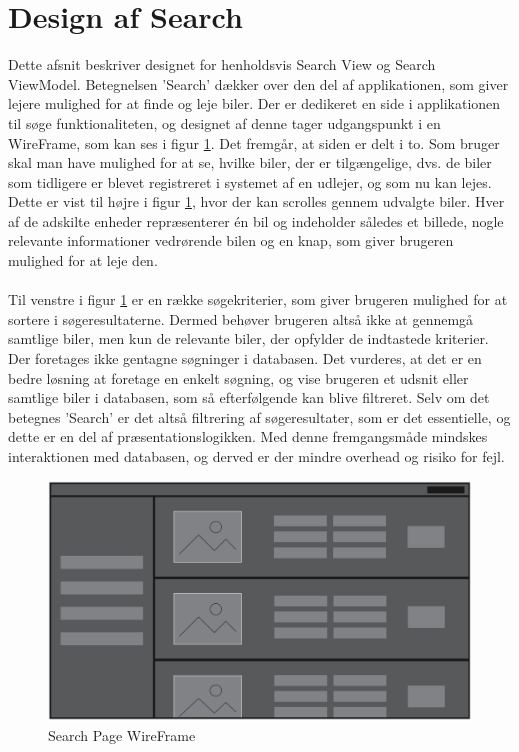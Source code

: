 \documentclass[SoftwareDesign/SoftwareDesign_main.tex]{subfiles}
\begin{document}
\section{Design af Search}
Dette afsnit beskriver designet for henholdsvis Search View og Search ViewModel. Betegnelsen 'Search' dækker over den del af applikationen, som giver lejere mulighed for at finde og leje biler. Der er dedikeret en side i applikationen til søge funktionaliteten, og designet af denne tager udgangspunkt i en WireFrame, som kan ses i figur \ref{fig:search_wireframe}. Det fremgår, at siden er delt i to. Som bruger skal man have mulighed for at se, hvilke biler, der er tilgængelige, dvs. de biler som tidligere er blevet registreret i systemet af en udlejer, og som nu kan lejes. Dette er vist til højre i figur \ref{fig:search_wireframe}, hvor der kan scrolles gennem udvalgte biler. Hver af de adskilte enheder repræsenterer én bil og indeholder således et billede, nogle relevante informationer vedrørende bilen og en knap, som giver brugeren mulighed for at leje den. \\\\Til venstre i figur \ref{fig:search_wireframe} er en række søgekriterier, som giver brugeren mulighed for at sortere i søgeresultaterne. Dermed behøver brugeren altså ikke at gennemgå samtlige biler, men kun de relevante biler, der opfylder de indtastede kriterier. Der foretages ikke gentagne søgninger i databasen. Det vurderes, at det er en bedre løsning at foretage en enkelt søgning, og vise brugeren et udsnit eller samtlige biler i databasen, som så efterfølgende kan blive filtreret. Selv om det betegnes 'Search' er det altså filtrering af søgeresultater, som er det essentielle, og dette er en del af præsentationslogikken. Med denne fremgangsmåde mindskes interaktionen med databasen, og derved er der mindre overhead og risiko for fejl.

\begin{figure}[H]
    \centering
    \includegraphics[width=\textwidth]{SoftwareDesign/MVVMDesigns/Graphics/SearchWireFrame.png}
    \caption{Search Page WireFrame}
    \label{fig:search_wireframe}
\end{figure}
\end{document}
